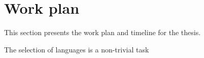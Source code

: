 \section{Work plan}

This section presents the work plan and timeline for the thesis.

The selection of languages is a non-trivial task

